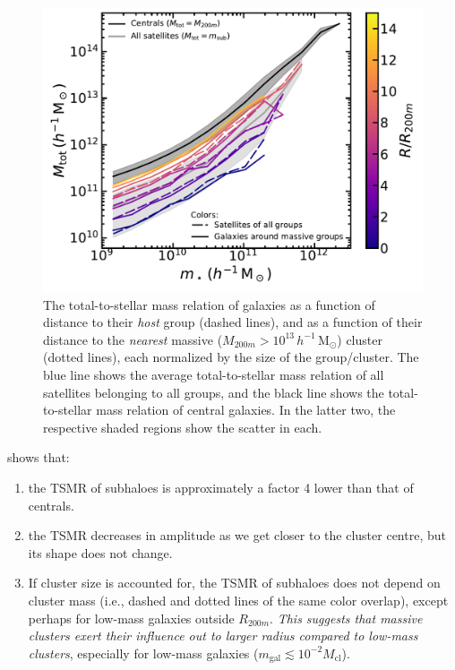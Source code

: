 \documentclass[usenatbib,fleqn]{mnras}
\newcommand{\Msun}{\mathrm{M}_\odot}
\begin{document}
\begin{figure}
  \centerline{\includegraphics[width=\linewidth]{total_to_stellar_groups_and_clusters.pdf}}
\caption{The total-to-stellar mass relation of galaxies as a function of distance to their \emph{host} group (dashed lines), and as a function of their distance to the \emph{nearest} massive ($M_{200m}>10^{13}\,h^{-1}\,\Msun$) cluster (dotted lines), each normalized by the size of the group/cluster. The blue line shows the average total-to-stellar mass relation of all satellites belonging to all groups, and the black line shows the total-to-stellar mass relation of central galaxies. In the latter two, the respective shaded regions show the scatter in each.}
\label{f:relation}
\end{figure}

 shows that:
\begin{enumerate}
  \item the TSMR of subhaloes is approximately a factor 4 lower than that of centrals.
  \item the TSMR decreases in amplitude as we get closer to the cluster centre, but its shape does not change.
  \item If cluster size is accounted for, the TSMR of subhaloes does not depend on cluster mass (i.e., dashed and dotted lines of the same color overlap), except perhaps for low-mass galaxies outside $R_{200m}$. \emph{This suggests that massive clusters exert their influence out to larger radius compared to low-mass clusters}, especially for low-mass galaxies ($m_\mathrm{gal}\lesssim10^{-2}M_\mathrm{cl}$).
\end{enumerate}
\end{document}
